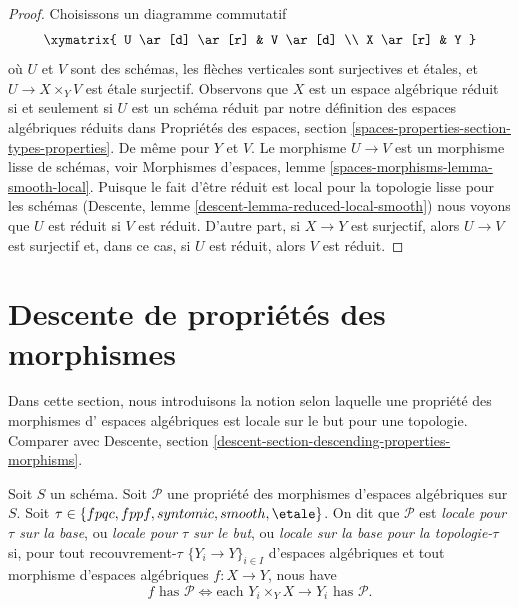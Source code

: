 \begin{proof}
Choisissons un diagramme commutatif
$$
\xymatrix{
U \ar[d] \ar[r] & V \ar[d] \\
X \ar[r] & Y
}
$$
où $U$ et $V$ sont des schémas, les flèches verticales sont surjectives et
\'etales, et $U \to X \times_Y V$ est \'etale surjectif. Observons que $X$ est
un espace algébrique réduit si et seulement si $U$ est un schéma réduit
par notre définition des espaces algébriques réduits dans
Propriétés des espaces, section \ref{spaces-properties-section-types-properties}.
De même pour $Y$ et $V$. 
Le morphisme $U \to V$ est un morphisme lisse de schémas, voir
Morphismes d'espaces, lemme \ref{spaces-morphisms-lemma-smooth-local}.
Puisque le fait d'être réduit est local pour la topologie lisse pour les
schémas (Descente, lemme \ref{descent-lemma-reduced-local-smooth})
nous voyons que $U$ est réduit si $V$ est réduit.
D'autre part, si $X \to Y$ est surjectif, alors $U \to V$ est
surjectif et, dans ce cas, si $U$ est réduit, alors $V$ est réduit.
\end{proof}







\section{Descente de propriétés des morphismes}
\label{section-descending-properties-morphisms}

\noindent
Dans cette section, nous introduisons la notion selon laquelle une propriété des morphismes d'
espaces algébriques est locale sur le but pour une topologie. Comparer avec
Descente, section \ref{descent-section-descending-properties-morphisms}.

\begin{definition}
\label{definition-property-morphisms-local}
Soit $S$ un schéma.
Soit $\mathcal{P}$ une propriété des morphismes d'espaces algébriques sur $S$.
Soit $\tau \in \{fpqc, fppf, syntomic, smooth, \etale\}$.
On dit que $\mathcal{P}$ est {\it locale pour $\tau$ sur la base}, ou
{\it locale pour $\tau$ sur le but}, ou
{\it locale sur la base pour la topologie-$\tau$} si, pour tout
recouvrement-$\tau$ $\{Y_i \to Y\}_{i \in I}$ d'espaces algébriques
et tout morphisme d'espaces algébriques $f : X \to Y$, nous
have
$$
f \text{ has }\mathcal{P}
\Leftrightarrow
\text{each }Y_i \times_Y X \to Y_i\text{ has }\mathcal{P}.
$$
\end{definition}

